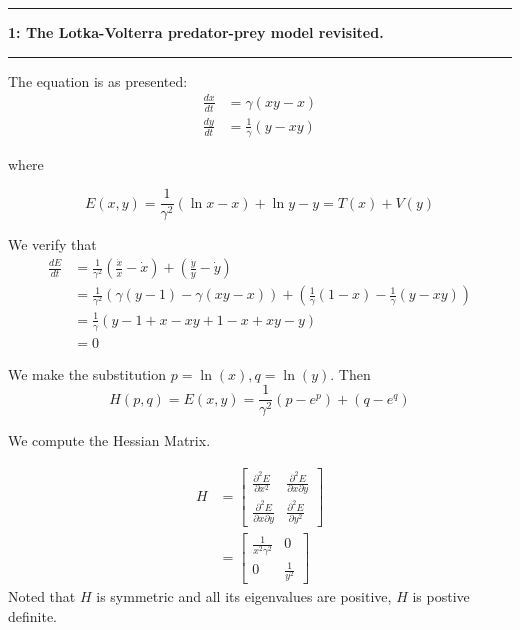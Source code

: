 \documentclass[11pt]{article}
\newcommand\question[2]{\vspace{.25in}\hrule\textbf{#1: #2}\vspace{.5em}\hrule\vspace{.10in}}
\begin{document}
\raggedright
\newcommand\NAME{Carl Kingsford}  %
\newcommand\ANDREWID{ckingsf}     %
\newcommand\HWNUM{1}              %



\question{1}{The Lotka-Volterra predator-prey model revisited.}
The equation is as presented:
\begin{align*}
  \frac{dx}{dt} &= \gamma(xy - x) \\
  \frac{dy}{dt} &= \frac{1}{\gamma}(y-xy)
\end{align*}

where

\[
   E(x, y) = \frac{1}{\gamma^2} (\ln x - x) + \ln y - y = T(x) + V(y)
\]

We verify that
\begin{align*}
  \frac{dE}{dt} &= \frac{1}{\gamma^2}\left(\frac{\dot{x}}{x} - \dot{x}\right) + \left(\frac{\dot{y}}{y} - \dot{y}\right) \\
                &= \frac{1}{\gamma^2}\left(\gamma(y-1)-\gamma(xy-x)\right) + \left(\frac{1}{\gamma}(1-x)-\frac{1}{\gamma}(y-xy)\right)\\
                &= \frac{1}{\gamma}(y-1+x-xy + 1 - x+ xy -y)\\
                &= 0
\end{align*}

We make the substitution $p=\ln(x), q=\ln(y)$. Then
\[H(p,q) = E(x,y) = \frac{1}{\gamma^2}(p-e^p) + (q - e^q)\]

We compute the Hessian Matrix.

\begin{align*}
  H &= \begin{bmatrix}\frac{\partial^{2} E}{\partial x^{2}} &\frac{\partial^{2} E}{\partial x\partial y} \\ \frac{\partial^{2} E}{\partial x\partial y} &\frac{\partial^{2} E}{\partial y^{2}} \end{bmatrix} \\
    &= \begin{bmatrix}\frac{1}{x^{2}\gamma^{2} } &0\\ 0&\frac{1}{y^{2}} \end{bmatrix}
\end{align*}
Noted that $H$ is symmetric and all its eigenvalues are positive, $H$ is postive definite. 
\end{document}

